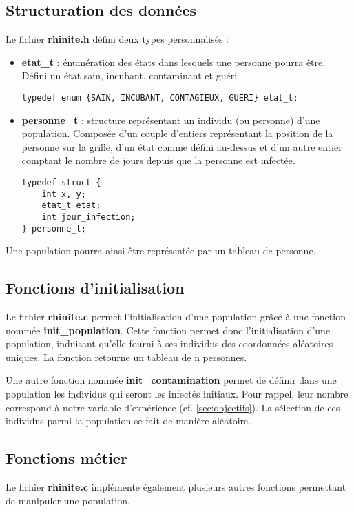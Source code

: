 \documentclass[12pt,french,titlepage]{article}
\begin{document}
\subsection{Structuration des données}
\label{sec:struct_donnees}
Le fichier \textbf{rhinite.h} défini deux types personnalisés :
\begin{itemize}
\item \textbf{etat\_t} : énumération des états dans lesquels une personne pourra être. Défini un état sain, incubant, contaminant et guéri.
\begin{lstlisting}
typedef enum {SAIN, INCUBANT, CONTAGIEUX, GUERI} etat_t;
\end{lstlisting}

\item \textbf{personne\_t} : structure représentant un individu (ou personne) d'une population. Composée d'un couple d'entiers représentant la position de la personne sur la grille, d'un état comme défini au-dessus et d'un autre entier comptant le nombre de jours depuis que la personne est infectée.
\begin{lstlisting}
typedef struct {
    int x, y;
    etat_t etat;
    int jour_infection;
} personne_t;
\end{lstlisting}
\end{itemize}

Une population pourra ainsi être représentée par un tableau de personne. 

\subsection{Fonctions d'initialisation}
Le fichier \textbf{rhinite.c} permet l'initialisation d'une population grâce à une fonction nommée \textbf{init\_population}. Cette fonction permet donc l'initialisation d'une population, induisant qu'elle fourni à ses individus des coordonnées aléatoires uniques. La fonction retourne un tableau de n personnes.

Une autre fonction nommée \textbf{init\_contamination} permet de définir dans une population les individus qui seront les infectés initiaux. Pour rappel, leur nombre correspond à notre variable d'expérience (cf. \ref{sec:objectifs}). La sélection de ces individus parmi la population se fait de manière aléatoire.   


\subsection{Fonctions métier}
Le fichier \textbf{rhinite.c} implémente également plusieurs autres fonctions permettant de manipuler une population.
\end{document}
